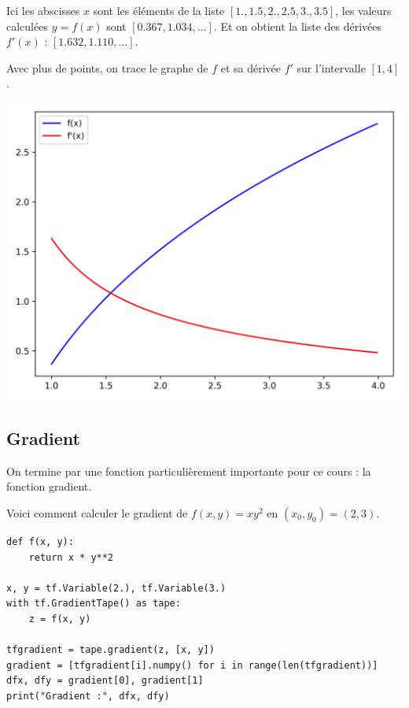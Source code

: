 \documentclass[11pt,class=report,crop=false]{standalone}
\begin{document}
Ici les abscisses $x$ sont les éléments de la liste $[1., 1.5, 2., 2.5, 3., 3.5]$,
les valeurs calculées $y=f(x)$ sont $[0.367, 1.034, \ldots ]$.
Et on obtient la liste des dérivées $f'(x)$ : $[1.632,  1.110, \ldots]$.


Avec plus de points, on trace le graphe de $f$ et sa dérivée $f'$ sur l'intervalle $[1,4]$.
\begin{center}
\includegraphics[scale=\myscale,scale=0.6]{figures/tenseur-derivee}
\end{center}


\subsection{Gradient}


On termine par une fonction particulièrement importante pour ce cours : la fonction gradient.


Voici comment calculer le gradient de $f(x,y) = xy^2$ en $(x_0,y_0)= (2,3)$.

\begin{lstlisting}
def f(x, y):
    return x * y**2 

x, y = tf.Variable(2.), tf.Variable(3.)
with tf.GradientTape() as tape:
    z = f(x, y)

tfgradient = tape.gradient(z, [x, y])
gradient = [tfgradient[i].numpy() for i in range(len(tfgradient))]
dfx, dfy = gradient[0], gradient[1]
print("Gradient :", dfx, dfy)
\end{lstlisting}
\end{document}
